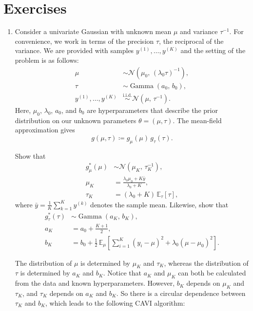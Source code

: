 
\section{Exercises}
\label{sec:10.4}

\begin{enumerate}

\item[10.1] Consider a univariate Gaussian with unknown mean $\mu$ and variance $\tau^{-1}$. For
convenience, we work in terms of the precision $\tau$, the reciprocal of the variance. We are
provided with samples $y^{(1)}, \ldots, y^{(K)}$ and the setting of the problem is as follows:
\begin{align*}
  \mu &\sim \mathcal{N}(\mu_0,\, (\lambda_0 \tau)^{-1}), \\
  \tau &\sim \operatorname{Gamma}(a_0,\, b_0), \\
  y^{(1)}, \ldots, y^{(K)} &\overset{\mathrm{i.i.d.}}{\sim} \mathcal{N}(\mu,\, \tau^{-1}).
\end{align*}
Here, $\mu_0$, $\lambda_0$, $a_0$, and $b_0$ are hyperparameters that describe the prior
distribution on our unknown parameters $\theta = (\mu, \tau)$. The mean-field approximation gives
\[
  g(\mu, \tau) \coloneqq g_\mu(\mu)\, g_\tau(\tau).
\]

Show that
\begin{align*}
  g_\mu^*(\mu) &\sim \mathcal{N}(\mu_K,\, \tau_K^{-1}), \\[4pt]
  \mu_K &= \frac{\lambda_0 \mu_0 + K\bar{y}}{\lambda_0 + K}, \\[4pt]
  \tau_K &= (\lambda_0 + K)\,\mathbb{E}_\tau[\tau],
\end{align*}
where $\bar{y} = \frac{1}{K}\sum_{k=1}^K y^{(k)}$ denotes the sample mean. Likewise, show that
\begin{align*}
  g_\tau^*(\tau) &\sim \operatorname{Gamma}(a_K,\, b_K), \\[4pt]
  a_K &= a_0 + \frac{K+1}{2}, \\[4pt]
  b_K &= b_0 + \frac{1}{2}\,\mathbb{E}_\mu\!\left[\sum_{i=1}^{K}(y_i - \mu)^2
         + \lambda_0(\mu - \mu_0)^2\right].
\end{align*}

The distribution of $\mu$ is determined by $\mu_K$ and $\tau_K$, whereas the distribution of $\tau$
is determined by $a_K$ and $b_K$. Notice that $a_K$ and $\mu_K$ can both be calculated from the
data and known hyperparameters. However, $b_K$ depends on $\mu_K$ and $\tau_K$, and $\tau_K$
depends on $a_K$ and $b_K$. So there is a circular dependence between $\tau_K$ and $b_K$, which
leads to the following CAVI algorithm:


\end{enumerate}
